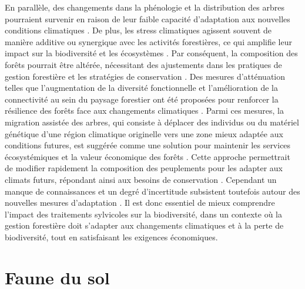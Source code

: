 En parallèle, des changements dans la phénologie et la distribution des arbres pourraient survenir en raison de leur faible capacité d'adaptation aux nouvelles conditions climatiques \citep{Aitken2008Adaptationmigration,Chuine2010Whydoes,Zhu2012Failuremigrate,Gray2013Trackingsuitable}.
De plus, les stress climatiques agissent souvent de manière additive ou synergique avec les activités forestières, ce qui amplifie leur impact sur la biodiversité et les écosystèmes \citep{Brook2008Synergiesextinction,Tremblay2018Harvestinginteracts,Ochs2022Responseterrestrial,Bouderbala2023Longtermeffect}. 
Par conséquent, la composition des forêts pourrait être altérée, nécessitant des ajustements dans les pratiques de gestion forestière et les stratégies de conservation \citep{McKenney2009Climatechange,Chmura2011Forestresponses,Lo2011Linkingclimate}.
Des mesures d'atténuation telles que l'augmentation de la diversité fonctionnelle et l'amélioration de la connectivité au sein du paysage forestier ont été proposées pour renforcer la résilience des forêts face aux changements climatiques \citep{Messier2019functionalcomplex}.
Parmi ces mesures, la migration assistée des arbres, qui consiste à déplacer des individus ou du matériel génétique d'une région climatique originelle vers une zone mieux adaptée aux conditions futures, 
est suggérée comme une solution pour maintenir les services écosystémiques et la valeur économique des forêts \citep{Vitt2010Assistedmigration,Pedlar2011implementationassisted,Ste-Marie2011Assistedmigration,Winder2011Ecologicalimplications}. 
Cette approche permettrait de modifier rapidement la composition des peuplements pour les adapter aux climats futurs, répondant ainsi aux besoins de conservation \citep{Dumroese2015Considerationsrestoring,Park2018Informationunderload,Park2023Provenancetrials}. 
Cependant un manque de connaissances et un degré d'incertitude subsistent toutefois autour des nouvelles mesures d'adaptation \citep{Klenk2015assistedmigration,Park2018Informationunderload}. 
Il est donc essentiel de mieux comprendre l'impact des traitements sylvicoles sur la biodiversité, dans un contexte où la gestion forestière doit s'adapter aux changements climatiques et à la perte de biodiversité, tout en satisfaisant les exigences économiques. 


\section*{Faune du sol}
\label{sec:soilfauna}


